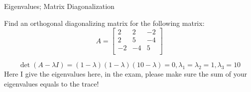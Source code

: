 \documentclass{beamer}
\begin{document}
\begin{frame}{Eigenvalues; Matrix Diagonalization}
\begin{example}
    Find an orthogonal diagonalizing matrix for the following matrix:
    \begin{equation*}
        A=\left[ \begin{matrix}
        2&		2&		-2\\
        2&		5&		-4\\
        -2&		-4&		5\\
    \end{matrix} \right]
    \end{equation*}
\end{example}

\begin{equation*}
    \det \left( A-\lambda I \right) =\left( 1-\lambda \right) \left( 1-\lambda \right) \left( 10-\lambda \right) =0, \lambda _1=\lambda _2=1, \lambda _3=10
\end{equation*}
Here I give the eigenvalues here, in the exam, please make sure the sum of your eigenvalues equals to the trace!
\end{frame}
\end{document}

